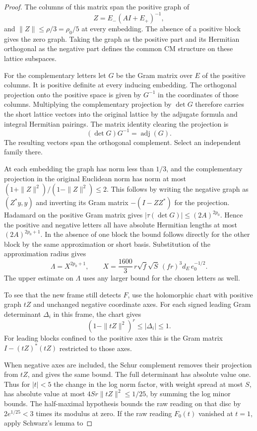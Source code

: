 \begin{proof}
The columns of this matrix span the positive graph of 
\[
  Z=E_-(A I+E_+)^{-1},
\]
 and
\(\|Z\|\le\rho/3=\rho_0/5\) at every embedding. The absence
of a positive block gives the zero graph. Taking the graph as
the positive part and its Hermitian orthogonal as the negative
part defines the common CM structure on these lattice subspaces.

For the complementary letters let \(G\) be the Gram matrix
over \(E\) of the positive columns. It is positive definite
at every inducing embedding. The orthogonal projection onto
the positive space is given by \(G^{-1}\) in the coordinates
of those columns. Multiplying the complementary projection
by \(\det G\) therefore carries the short lattice vectors into
the original lattice by the adjugate formula and integral
Hermitian pairings.
The matrix identity clearing the projection is
\[
  (\det G)G^{-1}=\operatorname{adj}(G).
\]
 The resulting vectors span the orthogonal
complement. Select an independent family there.

At each
embedding the graph has norm less than \(1/3\), and the
complementary projection in the original Euclidean norm
has norm at most \((1+\|Z\|^2)/(1-\|Z\|^2)\le2\).
This follows by writing the negative graph as \((Z^*y,y)\)
and inverting its Gram matrix \(-(I-ZZ^*)\) for the projection.
Hadamard on the positive Gram matrix gives
\(|\tau(\det G)|\le(2A)^{2p_0}\). Hence the positive
and negative letters all have absolute Hermitian lengths
at most \((2A)^{2p_0+1}\). In the absence of one block
the bound follows directly for the other block by the
same approximation or short basis. Substitution of the approximation radius gives
\[
 \Lambda=X^{2p_0+1},\qquad
 X=\frac{1600}{3}\,r\sqrt f\sqrt S\,(fr)^3 d_E\,e_0^{-1/2}.
\]
The upper estimate on \(\Lambda\) uses any larger bound
for the chosen letters as well.

To see that the new frame still detects \(F\), use the
holomorphic chart with positive graph \(tZ\) and unchanged
negative coordinate axes. For each signed leading Gram determinant \(\Delta_i\) in this frame, the chart gives
\[
  (1-\|tZ\|^2)^r\le|\Delta_i|\le1.
\]
For leading blocks confined to the positive axes this is the
Gram matrix \(I-(tZ)^*(tZ)\) restricted to those axes.

When negative axes are included, the Schur complement removes
their projection from \(tZ\), and gives the same bound.
The full determinant has absolute value one. Thus for
\(|t|<5\) the change in the log norm factor, with weight
spread at most \(S\), has absolute value at most
\(4Sr\|tZ\|^2\le1/25\), by summing the log minor bounds.
The half-maximal hypothesis bounds the raw reading on
that disc by \(2e^{1/25}<3\) times its modulus at zero.
If the raw reading \(F_0(t)\) vanished at \(t=1\), apply
Schwarz's lemma to


\end{proof}
